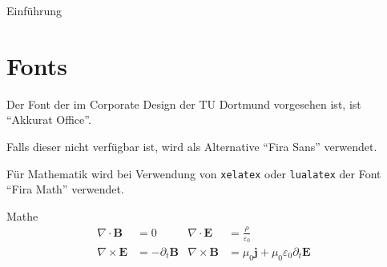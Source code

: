 \documentclass[aspectratio=1610, 9pt]{beamer}
\begin{document}
\begin{frame}{Einführung}
  \tableofcontents
\end{frame}

\section{Fonts}
\begin{frame}
  Der Font der im Corporate Design der TU Dortmund vorgesehen ist,
  ist \enquote{Akkurat Office}.

  Falls dieser nicht verfügbar ist, wird als Alternative \enquote{Fira Sans}
  verwendet.

  Für Mathematik wird bei Verwendung von \texttt{xelatex} oder \texttt{lualatex} der Font \enquote{Fira Math} verwendet.
\end{frame}

\begin{frame}{Mathe}
  \begin{align*}
    \nabla \cdot \symbf{B} &= 0 &
    \nabla \cdot \symbf{E} &= \frac{ρ}{ε_0} \\
    \nabla \times \symbf{E} &= -\partial_t \symbf{B} &
    \nabla \times \symbf{B} &= μ_0 \symbf{j} + μ_0 ε_0 \partial_t \symbf{E} &
  \end{align*}
\end{frame}
\end{document}
